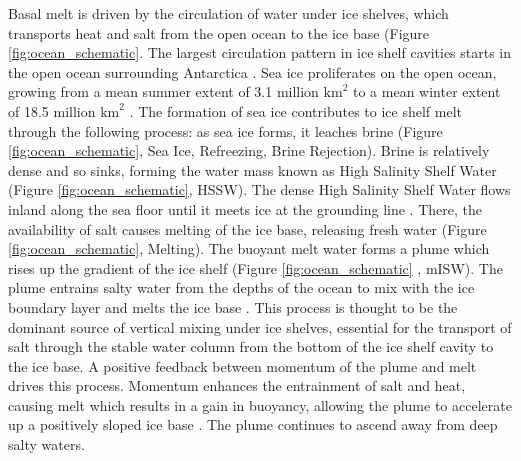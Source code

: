 Basal melt is driven by the circulation of water under ice shelves, which transports heat and salt from the open ocean to the ice base (Figure {\ref{fig:ocean_schematic}}. The largest circulation pattern in ice shelf cavities starts in the open ocean surrounding Antarctica \citep{jacobs1992melting}. Sea ice proliferates on the open ocean, growing from a mean summer extent of 3.1 million $\mathrm{km}^2$ to a mean winter extent of 18.5 million $\mathrm{km}^2$  \citep{hobbs2016review}. The formation of sea ice contributes to ice shelf melt through the following process: as sea ice forms, it leaches brine (Figure {\ref{fig:ocean_schematic}}, Sea Ice, Refreezing, Brine Rejection). Brine is relatively dense and so sinks, forming the water mass known as High Salinity Shelf Water (Figure {\ref{fig:ocean_schematic}}, HSSW). The dense High Salinity Shelf Water flows inland along the sea floor until it meets ice at the grounding line \citep{jacobs1992melting}. There, the availability of salt causes melting of the ice base, releasing fresh water (Figure {\ref{fig:ocean_schematic}}, Melting). The buoyant melt water forms a plume which rises up the gradient of the ice shelf (Figure {\ref{fig:ocean_schematic}
}, mISW). The plume entrains salty water from the depths of the ocean to mix with the ice boundary layer and melts the ice base \citep{jacobs1992melting}. 
This process is thought to be the dominant source of vertical mixing under ice shelves, essential for the transport of salt through the stable water column from the bottom of the ice shelf cavity to the ice base.  
A positive feedback between momentum of the plume and melt drives this process. Momentum enhances the entrainment of salt and heat, causing melt which results in a gain in buoyancy, allowing the plume to accelerate up a positively sloped ice base  \citep{jenkins1991one}.  The plume continues to ascend away from deep salty waters. 

